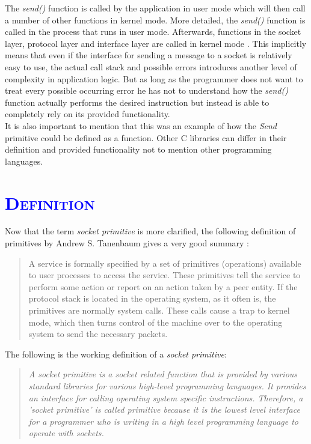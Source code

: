 \documentclass[xcolor=dvipsnames]{article}
\begin{document}
\noindent The \textit{send()} function is called by the application in user mode which will then call a number of other functions in kernel mode. More detailed, the \textit{send()} function is called in the process that runs in user mode. Afterwards, functions in the socket layer, protocol layer and interface layer are called in kernel mode \cite[p. 2, 16]{IBM_Anupama}. This implicitly means that even if the interface for sending a message to a socket is relatively easy to use, the actual call stack and possible errors introduces another level of complexity in application logic. But as long as the programmer does not want to treat every possible occurring error he has not to understand how the \textit{send()} function actually performs the desired instruction but instead is able to completely rely on its provided functionality.\\

\noindent It is also important to mention that this was an example of how the \textit{Send} primitive could be defined as a function. Other C libraries can differ in their definition and provided functionality not to mention other programming languages.

\section{\scshape{\textcolor{blue}{Definition}}} \label{definition}

Now that the term \textit{socket primitive} is more clarified, the following definition of primitives by Andrew S. Tanenbaum gives a very good summary \cite[p. 38, ch. 1.3.4]{computer_networks}:

\begin{quote}
A service is formally specified by a set of primitives (operations) available to user processes to access the service. These primitives tell the service to perform some action or report on an action taken by a peer entity. If the protocol stack is located in the operating system, as it often is, the primitives are normally system calls. These calls cause a trap to kernel mode, which then turns control of the machine over to the operating system to send the necessary packets.
\end{quote}

\noindent The following is the working definition of a \textit{socket primitive}:

\begin{quote}

\textit{A socket primitive is a socket related function that is provided by various standard libraries for various high-level programming languages. It provides an interface for calling operating system specific instructions. Therefore, a 'socket primitive' is called primitive because it is the lowest level interface for a programmer who is writing in a high level programming language to operate with sockets.}

\end{quote}
\end{document}
